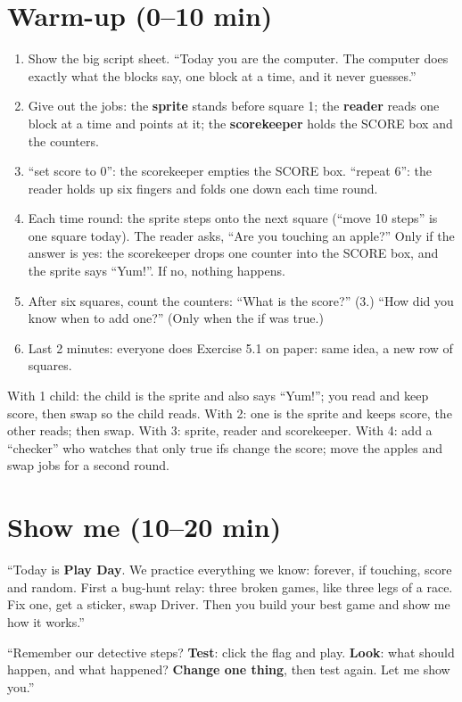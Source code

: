 \section{Warm-up (0--10 min)}
\begin{unplugged}
\begin{enumerate}[leftmargin=1.4em,itemsep=1pt]
  \item Show the big script sheet. \enquote{Today you are the computer. The computer does exactly what the blocks say, one block at a time, and it never guesses.}
  \item Give out the jobs: the \textbf{sprite} stands before square 1; the \textbf{reader} reads one block at a time and points at it; the \textbf{scorekeeper} holds the SCORE box and the counters.
  \item \enquote{set score to 0}: the scorekeeper empties the SCORE box. \enquote{repeat 6}: the reader holds up six fingers and folds one down each time round.
  \item Each time round: the sprite steps onto the next square (\enquote{move 10 steps} is one square today). The reader asks, \enquote{Are you touching an apple?} Only if the answer is yes: the scorekeeper drops one counter into the SCORE box, and the sprite says \enquote{Yum!}. If no, nothing happens.
  \item After six squares, count the counters: \enquote{What is the score?} (3.) \enquote{How did you know when to add one?} (Only when the if was true.)
  \item Last 2 minutes: everyone does Exercise 5.1 on paper: same idea, a new row of squares.
\end{enumerate}
With 1 child: the child is the sprite and also says \enquote{Yum!}; you read and keep score, then swap so the child reads. With 2: one is the sprite and keeps score, the other reads; then swap. With 3: sprite, reader and scorekeeper. With 4: add a \enquote{checker} who watches that only true ifs change the score; move the apples and swap jobs for a second round.
\end{unplugged}

\section{Show me (10--20 min)}
\begin{teacherscript}
\enquote{Today is \textbf{Play Day}. We practice everything we know: forever, if touching, score and random. First a bug-hunt relay: three broken games, like three legs of a race. Fix one, get a sticker, swap Driver. Then you build your best game and show me how it works.}

\enquote{Remember our detective steps? \textbf{Test}: click the flag and play. \textbf{Look}: what should happen, and what happened? \textbf{Change one thing}, then test again. Let me show you.}
\end{teacherscript}

